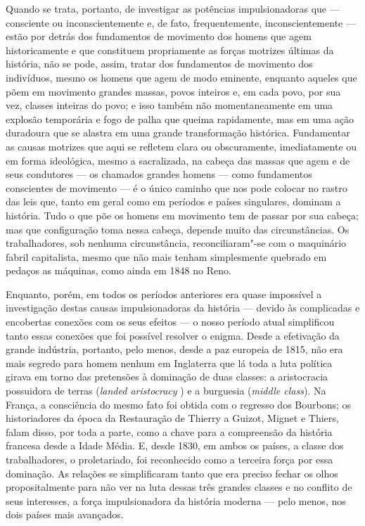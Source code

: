 Quando se trata, portanto, de investigar as potências impulsionadoras
que --- consciente ou inconscientemente e, de fato, frequentemente,
inconscientemente --- estão por detrás dos fundamentos de movimento dos
homens que agem historicamente e que constituem propriamente as forças
motrizes últimas da história, não se pode, assim, tratar dos fundamentos
de movimento dos indivíduos, mesmo os homens que agem de modo eminente,
enquanto aqueles que põem em movimento grandes massas, povos inteiros e,
em cada povo, por sua vez, classes inteiras do povo; e isso também não
momentaneamente em uma explosão temporária e fogo de palha que queima
rapidamente, mas em uma ação duradoura que se alastra em uma grande
transformação histórica. Fundamentar as causas motrizes que aqui se
refletem clara ou obscuramente, imediatamente ou em forma ideológica,
mesmo a sacralizada, na cabeça das massas que agem e de seus condutores
--- os chamados grandes homens --- como fundamentos conscientes de movimento
--- é o único caminho que nos pode colocar no rastro das leis que, tanto
em geral como em períodos e países singulares, dominam a história. Tudo
o que põe os homens em movimento tem de passar por sua cabeça; mas que
configuração toma nessa cabeça, depende muito das circunstâncias. Os
trabalhadores, sob nenhuma circunstância, reconciliaram"-se com o
maquinário fabril capitalista, mesmo que não mais tenham simplesmente
quebrado em pedaços as máquinas, como ainda em 1848 no Reno.

Enquanto, porém, em todos os períodos anteriores era quase impossível a
investigação destas causas impulsionadoras da história --- devido às
complicadas e encobertas conexões com os seus efeitos --- o nosso período
atual simplificou tanto essas conexões que foi possível resolver o
enigma. Desde a efetivação da grande indústria, 
portanto, pelo menos, desde a paz europeia de 1815, não era mais segredo
para homem nenhum em Inglaterra que lá toda a luta política girava em
torno das pretensões à dominação de duas classes: a aristocracia
possuidora de terras (\emph{landed
aristocracy }) e a burguesia (\emph{middle
class}). Na França, a consciência do mesmo
fato foi obtida com o regresso dos Bourbons; os historiadores da época
da Restauração de Thierry a Guizot, Mignet e Thiers,
falam disso, por toda a parte, como a chave para a compreensão da
história francesa desde a Idade Média. E, desde 1830, em ambos os
países, a classe dos trabalhadores, o proletariado, foi reconhecido como
a terceira força por essa dominação. As relações se 
simplificaram tanto que era preciso fechar os olhos propositalmente para
não ver na luta dessas três grandes classes e no conflito de seus
interesses, a força impulsionadora da história moderna --- pelo menos, nos
dois países mais avançados.\est\

